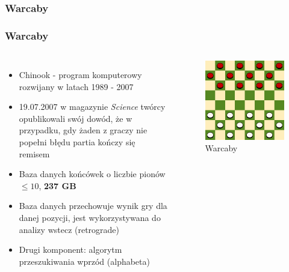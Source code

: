\documentclass[polish,envcountsect,10pt]{beamer}
\begin{document}
            \subsubsection{Warcaby}
                \begin{frame}
                    \frametitle{Warcaby}
                    \begin{columns}
                        \begin{itemize}
                            \item<1-> Chinook - program komputerowy rozwijany w latach 1989 - 2007
                            \item<2-> 19.07.2007 w magazynie \textit{Science} twórcy opublikowali swój dowód, że w przypadku, gdy żaden z graczy nie popełni błędu partia kończy się remisem
                            \item<3-> Baza danych końcówek o liczbie pionów $\leq 10$, \textbf{237 GB}
                            \item<4-> Baza danych przechowuje wynik gry dla danej pozycji, jest wykorzystywana do analizy wstecz (retrograde)
                            \item<4-> Drugi komponent: algorytm przeszukiwania wprzód (alphabeta)
                        \end{itemize}
                        \begin{figure}[H]
                            \centering
                            \includegraphics[width=\textwidth]{images/checkers}
                            \caption{Warcaby}
                        \end{figure}
                    \end{columns}
                \end{frame}
\end{document}
